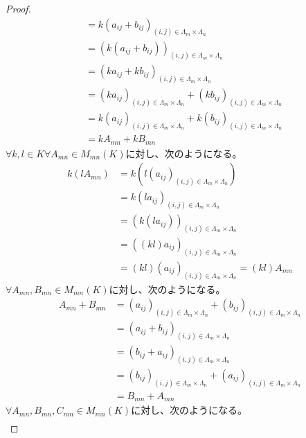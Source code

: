 \documentclass[dvipdfmx]{jsarticle}
\begin{document}
\begin{proof}
\begin{align*}
&= k\left( a_{ij} + b_{ij} \right)_{(i,j) \in \varLambda_{m} \times \varLambda_{n}}\\
&= \left( k\left( a_{ij} + b_{ij} \right) \right)_{(i,j) \in \varLambda_{m} \times \varLambda_{n}}\\
&= \left( ka_{ij} + kb_{ij} \right)_{(i,j) \in \varLambda_{m} \times \varLambda_{n}}\\
&= \left( ka_{ij} \right)_{(i,j) \in \varLambda_{m} \times \varLambda_{n}} + \left( kb_{ij} \right)_{(i,j) \in \varLambda_{m} \times \varLambda_{n}}\\
&= k\left( a_{ij} \right)_{(i,j) \in \varLambda_{m} \times \varLambda_{n}} + k\left( b_{ij} \right)_{(i,j) \in \varLambda_{m} \times \varLambda_{n}}\\
&= kA_{mn} + kB_{mn}
\end{align*}
$\forall k,l \in K\forall A_{mn} \in M_{mn}(K)$に対し、次のようになる。
\begin{align*}
k\left( lA_{mn} \right) &= k\left( l\left( a_{ij} \right)_{(i,j) \in \varLambda_{m} \times \varLambda_{n}} \right)\\
&= k\left( la_{ij} \right)_{(i,j) \in \varLambda_{m} \times \varLambda_{n}}\\
&= \left( k\left( la_{ij} \right) \right)_{(i,j) \in \varLambda_{m} \times \varLambda_{n}}\\
&= \left( (kl)a_{ij} \right)_{(i,j) \in \varLambda_{m} \times \varLambda_{n}}\\
&= (kl)\left( a_{ij} \right)_{(i,j) \in \varLambda_{m} \times \varLambda_{n}} = (kl)A_{mn}
\end{align*}
$\forall A_{mn},B_{mn} \in M_{mn}(K)$に対し、次のようになる。
\begin{align*}
A_{mn} + B_{mn} &= \left( a_{ij} \right)_{(i,j) \in \varLambda_{m} \times \varLambda_{n}} + \left( b_{ij} \right)_{(i,j) \in \varLambda_{m} \times \varLambda_{n}}\\
&= \left( a_{ij} + b_{ij} \right)_{(i,j) \in \varLambda_{m} \times \varLambda_{n}}\\
&= \left( b_{ij} + a_{ij} \right)_{(i,j) \in \varLambda_{m} \times \varLambda_{n}}\\
&= \left( b_{ij} \right)_{(i,j) \in \varLambda_{m} \times \varLambda_{n}} + \left( a_{ij} \right)_{(i,j) \in \varLambda_{m} \times \varLambda_{n}}\\
&= B_{mn} + A_{mn}
\end{align*}
$\forall A_{mn},B_{mn},C_{mn} \in M_{mn}(K)$に対し、次のようになる。
\begin{align*}

\end{align*}
\end{proof}
\end{document}
